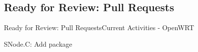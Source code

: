 ﻿\subsection{Ready for Review: Pull Requests}
\begin{frame}[t]{\alert{Ready for Review:} Pull Requests}{Current Activities - OpenWRT}

  \begin{description}
    \item [{$\Longrightarrow$ \color{darkgreen}Ready for Review}]
    \begin{description}
      \item [openwrt/packages] SNode.C: Add package\\\href{https://github.com/openwrt/packages/pull/22054}{}
    \end{description}
    \item [\color{darkgreen}{Open Andere}]
  \end{description}
\end{frame}
